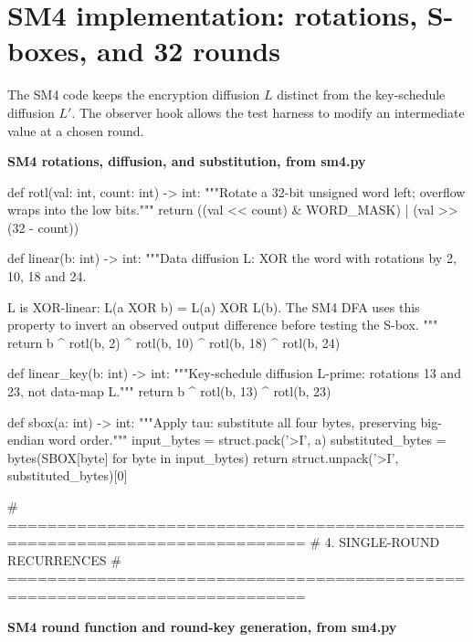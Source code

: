\section{SM4 implementation: rotations, S-boxes, and 32 rounds}
The SM4 code keeps the encryption diffusion $L$ distinct from the key-schedule diffusion $L'$. The observer hook allows the test harness to modify an intermediate value at a chosen round.
\par\smallskip\noindent\textbf{SM4 rotations, diffusion, and substitution, from sm4.py}\par
\begin{lightcode}
def rotl(val: int, count: int) -> int:
    """Rotate a 32-bit unsigned word left; overflow wraps into the low bits."""
    return ((val << count) & WORD_MASK) | (val >> (32 - count))


def linear(b: int) -> int:
    """Data diffusion L: XOR the word with rotations by 2, 10, 18 and 24.

    L is XOR-linear: L(a XOR b) = L(a) XOR L(b). The SM4 DFA uses this
    property to invert an observed output difference before testing the S-box.
    """
    return b ^ rotl(b, 2) ^ rotl(b, 10) ^ rotl(b, 18) ^ rotl(b, 24)


def linear_key(b: int) -> int:
    """Key-schedule diffusion L-prime: rotations 13 and 23, not data-map L."""
    return b ^ rotl(b, 13) ^ rotl(b, 23)


def sbox(a: int) -> int:
    """Apply tau: substitute all four bytes, preserving big-endian word order."""
    input_bytes = struct.pack('>I', a)
    substituted_bytes = bytes(SBOX[byte] for byte in input_bytes)
    return struct.unpack('>I', substituted_bytes)[0]


# ============================================================================
# 4. SINGLE-ROUND RECURRENCES
# ============================================================================
\end{lightcode}
\par\smallskip\noindent\textbf{SM4 round function and round-key generation, from sm4.py}\par
